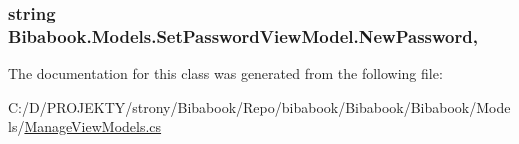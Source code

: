 \subsubsection[{New\+Password}]{\setlength{\rightskip}{0pt plus 5cm}string Bibabook.\+Models.\+Set\+Password\+View\+Model.\+New\+Password\hspace{0.3cm}{\ttfamily [get]}, {\ttfamily [set]}}\label{class_bibabook_1_1_models_1_1_set_password_view_model_a03aa7070ad418f1a3ca64ebbbf57f258}


The documentation for this class was generated from the following file\+:\begin{DoxyCompactItemize}
\item 
C\+:/\+D/\+P\+R\+O\+J\+E\+K\+T\+Y/strony/\+Bibabook/\+Repo/bibabook/\+Bibabook/\+Bibabook/\+Models/\hyperlink{_manage_view_models_8cs}{Manage\+View\+Models.\+cs}\end{DoxyCompactItemize}
